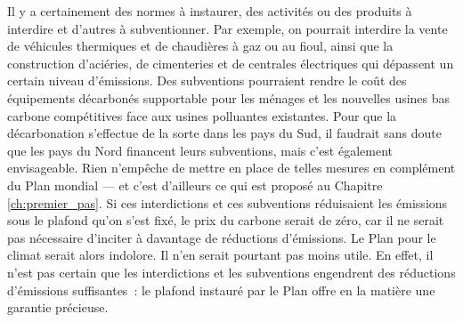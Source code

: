 \documentclass[a5paper,french]{memoir}
\begin{document}
Il y a certainement des normes à instaurer, des activités ou des produits à interdire et d'autres à subventionner. Par exemple, on pourrait interdire la vente de véhicules thermiques et de chaudières à gaz ou au fioul, ainsi que la construction d'aciéries, de cimenteries et de centrales électriques qui dépassent un certain niveau d'émissions. Des subventions pourraient rendre le coût des équipements décarbonés supportable pour les ménages et les nouvelles usines bas carbone compétitives face aux usines polluantes existantes. Pour que la décarbonation s'effectue de la sorte dans les pays du Sud, il faudrait sans doute que les pays du Nord financent leurs subventions, mais c'est également envisageable. Rien n'empêche de mettre en place de telles mesures en complément du Plan mondial --- et c'est d'ailleurs ce qui est proposé au Chapitre \ref{ch:premier_pas}. Si ces interdictions et ces subventions réduisaient les émissions sous le plafond qu'on s'est fixé, le prix du carbone serait de zéro, car il ne serait pas nécessaire d'inciter à davantage de réductions d'émissions. Le Plan pour le climat serait alors indolore. Il n'en serait pourtant pas moins utile. En effet, il n'est pas certain que les interdictions et les subventions engendrent des réductions d'émissions suffisantes~: le plafond instauré par le Plan offre en la matière une garantie précieuse.
\end{document}
